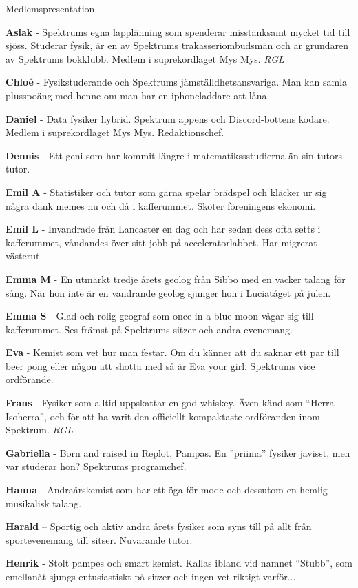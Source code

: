 \documentclass{spektraklet}
\begin{document}
\begin{artikel}{Medlemspresentation}{}
\begin{twocolumns}
\textbf{Aslak} - Spektrums egna lapplänning som spenderar misstänksamt mycket tid till sjöss. Studerar fysik, är en av Spektrums trakasseriombudsmän och är grundaren av Spektrums bokklubb. Medlem i suprekordlaget Mys Mys. \emph{RGL}

\textbf{Chloé} - Fysikstuderande och Spektrums jämställdhetsansvariga. Man kan samla plusspoäng med henne om man har en iphoneladdare att låna.

\textbf{Daniel} - Data fysiker hybrid. Spektrum appens och Discord-bottens kodare. Medlem i suprekordlaget Mys Mys. Redaktionschef.

\textbf{Dennis} - Ett geni som har kommit längre i matematikssstudierna än sin tutors tutor.

\textbf{Emil A} - Statistiker och tutor som gärna spelar brädspel och kläcker ur sig några dank memes nu och då i kafferummet. Sköter föreningens ekonomi.

\textbf{Emil L} - Invandrade från Lancaster en dag och har sedan dess ofta setts i kafferummet, våndandes över sitt jobb på acceleratorlabbet. Har migrerat västerut. %

\textbf{Emma M} - En utmärkt tredje årets geolog från Sibbo med en vacker talang för sång. När hon inte är en vandrande geolog sjunger hon i Luciatåget på julen. %

\textbf{Emma S} - Glad och rolig geograf som once in a blue moon vågar sig till kafferummet. Ses främst på Spektrums sitzer och andra evenemang.

\textbf{Eva} - Kemist som vet hur man festar. Om du känner att du saknar ett par till beer pong eller någon att shotta med så är Eva your girl. Spektrums vice ordförande.

\textbf{Frans} - Fysiker som alltid uppskattar en god whiskey. Även känd som ``Herra Isoherra'', och för att ha varit den officiellt kompaktaste ordföranden inom Spektrum. \emph{RGL} %

\textbf{Gabriella} - Born and raised in Replot, Pampas. En ''priima'' fysiker javisst, men var studerar hon? Spektrums programchef.

\textbf{Hanna} - Andraårskemist som har ett öga för mode och dessutom en hemlig musikalisk talang.

\textbf{Harald} – Sportig och aktiv andra årets fysiker som syns till på allt från sportevenemang till sitser. Nuvarande tutor.

\textbf{Henrik} - Stolt pampes och smart kemist. Kallas ibland vid namnet “Stubb”, som emellanåt sjungs entusiastiskt på sitzer och ingen vet riktigt varför... %


\end{twocolumns}
\end{artikel}
\end{document}

